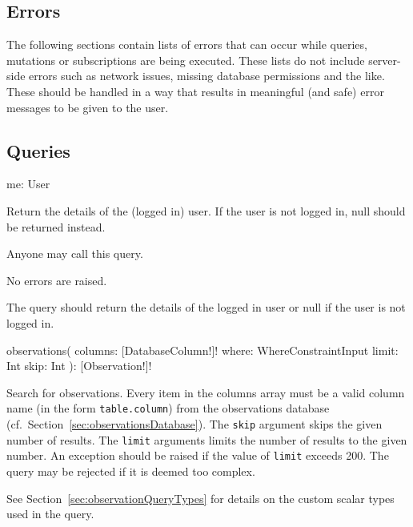 \subsection{Errors}

The following sections contain lists of errors that can occur while queries, mutations or subscriptions are being executed. These lists do not include server-side errors such as network issues, missing database permissions and the like. These should be handled in a way that results in meaningful (and safe) error messages to be given to the user.

\subsection{Queries}


\begin{code}
me: User
\end{code}

Return the details of the (logged in) user. If the user is not logged in, null should be returned instead.

\restrictions

Anyone may call this query.

\errors

No errors are raised.

\functionality

The query should return the details of the logged in user or null if the user is not logged in.

\label{sec:observationsQuery}

\begin{code}
observations(
  columns: [DatabaseColumn!]!
  where: WhereConstraintInput
  limit: Int
  skip: Int
): [Observation!]!
\end{code}

Search for observations. Every item in the columns array must be a valid column name (in the form \verb|table.column|) from the observations database (cf.~Section~\ref{sec:observationsDatabase}). The \verb|skip| argument skips the given number of results. The \verb|limit| arguments limits the number of results to the given number. An exception should be raised if the value of \verb|limit| exceeds 200. The query may be rejected if it is deemed too complex.

See Section~\ref{sec:observationQueryTypes} for details on the custom scalar types used in the query.

